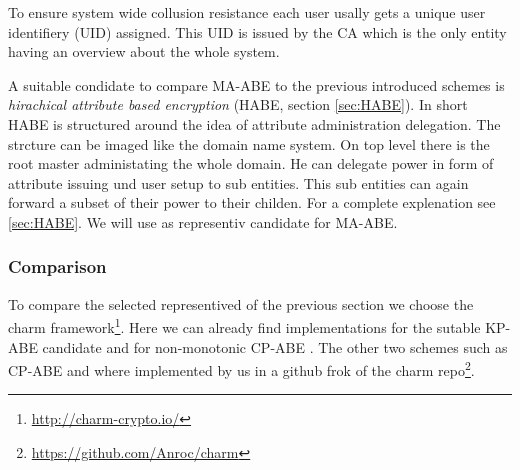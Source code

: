 To ensure system wide collusion resistance each user usally gets a unique user identifiery (\ac{UID}) assigned. This \ac{UID} is issued by the \ac{CA} which is the only entity having an overview about the whole system. 

A suitable condidate to compare \ac{MA-ABE} to the previous introduced schemes is \textit{hirachical attribute based encryption} (\ac{HABE}, section \ref{sec:HABE}). In short \ac{HABE} is structured around the idea of attribute administration delegation. The strcture can be imaged like the domain name system. On top level there is the root master administating the whole domain. He can delegate power in form of attribute issuing und user setup to sub entities. This sub entities can again forward a subset of their power to their childen. For a complete explenation see \ref{sec:HABE}. We will use \cite{Wang:2010:HAE:1866307.1866414} as representiv candidate for \ac{MA-ABE}. 

\subsubsection{Comparison}
To compare the selected representived of the previous section we choose the charm framework\footnote{\url{http://charm-crypto.io/}}. Here we can already find implementations for the sutable \ac{KP-ABE} candidate \cite{lewko2010revocation} and for non-monotonic \ac{CP-ABE} \cite{10.1007/978-3-642-54631-0_16}. The other two schemes such as \ac{CP-ABE} \cite{liu2016practical} and \cite{wang2011hierarchical} where implemented by us in a github frok of the charm repo\footnote{\url{https://github.com/Anroc/charm}}. 

